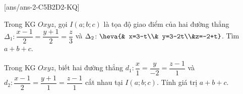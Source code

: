 [ans/ans-2-C5B2D2-KQ]
\TNSA
\begin{ex}%
	Trong KG $Oxyz$, gọi $I(a;b;c)$ là tọa độ giao điểm của hai đường thẳng $\Delta_1 \colon \dfrac{x-1}{2}=\dfrac{y+1}{2}=\dfrac{z}{3}$ và  $\Delta_2 \colon \heva{& x=3-t\\& y=3-2t\\&z=-2+t}$. Tìm $a+b+c$.
\end{ex}
\begin{ex}%
	Trong KG $Oxyz$, biết hai đường thẳng $d_1 \colon \dfrac{x}{1}=\dfrac{y}{-2}=\dfrac{z-1}{1}$ và  $d_2 \colon \dfrac{x-1}{2}=\dfrac{y+1}{1}=\dfrac{z-1}{1}$ cắt nhau tại $I(a;b;c)$. Tính giá trị $a+b+c$.
\end{ex}

